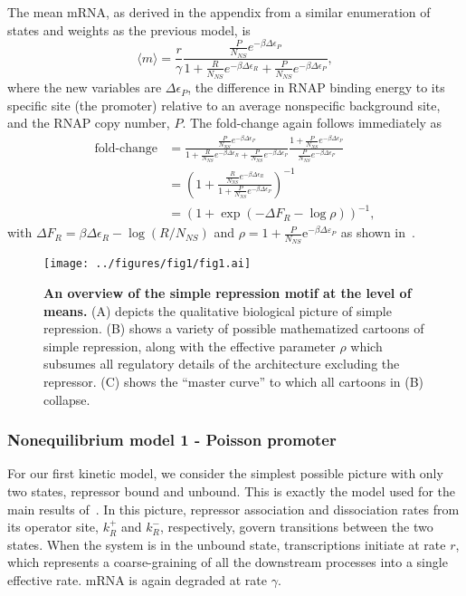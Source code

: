 The mean mRNA, as derived in the appendix from a similar enumeration of states
and weights as the previous model, is
\begin{equation}
\langle m \rangle = \frac{r}{\gamma}
\frac{\frac{P}{N_{NS}} e^{-\beta\Delta\epsilon_P}}
        {
        1 + \frac{R}{N_{NS}} e^{-\beta\Delta\epsilon_R}
        + \frac{P}{N_{NS}} e^{-\beta\Delta\epsilon_P}
        },
\end{equation}
where the new variables are $\Delta\epsilon_P$, the difference in RNAP binding
energy to its specific site (the promoter) relative to an average nonspecific
background site, and the RNAP copy number, $P$. The fold-change again follows
immediately as
\begin{align}
\text{fold-change}
&= \frac{\frac{P}{N_{NS}} e^{-\beta\Delta\epsilon_P}}
        {
        1 + \frac{R}{N_{NS}} e^{-\beta\Delta\epsilon_R}
        + \frac{P}{N_{NS}} e^{-\beta\Delta\epsilon_P}
        }
\frac{1 + \frac{P}{N_{NS}} e^{-\beta\Delta\epsilon_P}}
        {\frac{P}{N_{NS}} e^{-\beta\Delta\epsilon_P}}
\\
&= \left(
1 + \frac{\frac{R}{N_{NS}} e^{-\beta\Delta\epsilon_R}}
        {1 + \frac{P}{N_{NS}} e^{-\beta\Delta\epsilon_P}}
\right)^{-1}
\\
&= (1 + \exp(-\Delta F_R - \log\rho))^{-1},
\end{align}
with $\Delta F_R = \beta\Delta\epsilon_R - \log(R/N_{NS})$ and $\rho = 1 +
\frac{P}{N_{NS}}\mathrm{e}^{-\beta\Delta\varepsilon_P}$ as shown
in~.

\begin{figure}%
\centering
\texttt{[image: ../figures/fig1/fig1.ai]}
\caption{\textbf{An overview of the simple repression motif at the level of
means.} (A) depicts the qualitative biological picture of simple repression. (B)
shows a variety of possible mathematized cartoons of simple repression, along
with the effective parameter $\rho$ which subsumes all regulatory details of the
architecture excluding the repressor. (C) shows the ``master curve'' to which
all cartoons in (B) collapse.}
\label{fig1:means_cartoons}
\end{figure}

\subsubsection{Nonequilibrium model 1 - Poisson promoter}
For our first kinetic model, we consider the simplest possible picture with only
two states, repressor bound and unbound. This is exactly the model used for the
main results of~\cite{Jones2014}. In this picture, repressor association and
dissociation rates from its operator site, $k_R^+$ and $k_R^-$, respectively,
govern transitions between the two states. When the system is in the unbound
state, transcriptions initiate at rate $r$, which represents a coarse-graining
of all the downstream processes into a single effective rate. mRNA is again
degraded at rate $\gamma$.

